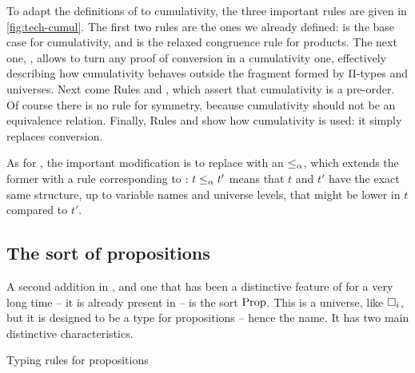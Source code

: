 To adapt the definitions of  to cumulativity,
the three important rules are given in \cref{fig:tech-cumul}.
The first two rules are the ones we already defined:  is the base case for cumulativity, and 
is the relaxed congruence rule for products. The next one, , allows
to turn any proof of conversion in a cumulativity one, effectively describing how cumulativity
behaves outside the fragment formed by Π-types and universes. 
Next come Rules  and , which assert that cumulativity
is a pre-order. Of course there is no rule for symmetry, because cumulativity should not be
an equivalence relation. Finally, Rules  and  show how
cumulativity is used: it simply replaces conversion.

\AP
As for , the important modification is to replace 
with an  $\leq_{\alpha}$, which extends the former with a rule corresponding to
: $t \leq_{\alpha} t'$ means that $t$ and $t'$ have the exact
same structure, up to variable names and universe levels, that might be lower in $t$ compared
to $t'$.

\subsection{The sort of propositions}


A second addition in , and one that has been a distinctive feature of 
for a very long time – it is already present in  –
is the sort $\operatorname{Prop}$. This is a universe, like $\uni[i]$, but it is designed to
be a type for propositions – hence the name. It has two main distinctive characteristics.

\begin{marginfigure}
  \caption{Typing rules for propositions}
  \label{fig:cic-prop}
\end{marginfigure}

